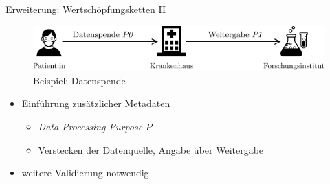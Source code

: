 \begin{frame}{Erweiterung: Wertschöpfungsketten II \footnotesize\cite{bothSolidBasedB2BData2025}}
    \addtocounter{figure}{-1}
    \begin{figure}
        \includegraphics[width=\textwidth]{./assets/example_horizontal.drawio.pdf}
        \caption{Beispiel: Datenspende}
    \end{figure}
    
    \vspace{-1em}

    \begin{itemize}
        \item Einführung zusätzlicher Metadaten
        \begin{itemize}
            \item \emph{Data Processing Purpose} $P$
            

            \item Verstecken der Datenquelle, Angabe über Weitergabe
        \end{itemize}

        \item<2-> weitere Validierung notwendig
    \end{itemize}


\end{frame}
